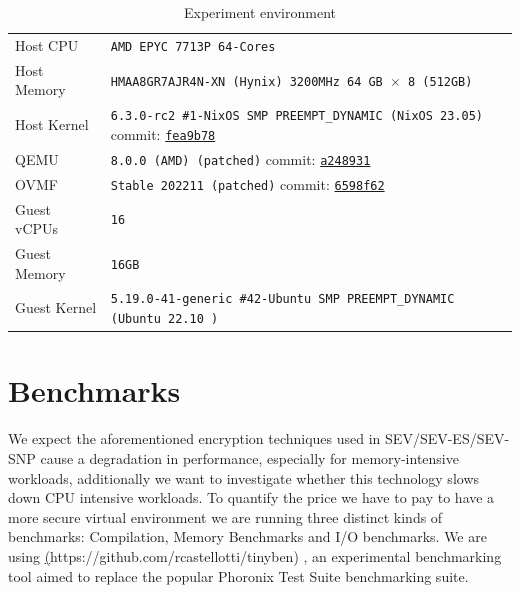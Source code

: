 \documentclass[twocolumn]{article}
\begin{document}
    \begin{table}
        \small
        \centering
        \label{tab:experiment-environment}
        \begin{tabular}{l|l}
            \hline
            Host CPU      & \texttt{AMD EPYC 7713P 64-Cores}                                            \\
            Host Memory   & \texttt{HMAA8GR7AJR4N-XN (Hynix) 3200MHz 64 GB $\times$ 8 (512GB)}          \\
            Host Kernel   & \texttt{6.3.0-rc2 \#1-NixOS SMP PREEMPT\_DYNAMIC (NixOS 23.05)} commit: \href{https://github.com/AMDESE/linux/tree/fea9b785bfa90e015c7d81526e36060da1bf01d1}{\texttt{fea9b78}}            \\
            QEMU          & \texttt{8.0.0 (AMD) (patched)} commit: \href{https://github.com/AMDESE/qemu/tree/a248931547843b9edb0f3b0c7d6d0c76ffdf7659}{\texttt{a248931}}                                             \\
            OVMF          & \texttt{Stable 202211 (patched)} commit: \href{https://github.com/AMDESE/ovmf/commit/6598f62bda4eb884c65d6c0aed7ede64258a41d8}{\texttt{6598f62}}                                     \\
            Guest vCPUs   & \texttt{16}                                                                 \\
            Guest Memory  & \texttt{16GB}                                                               \\
            Guest Kernel  & \texttt{5.19.0-41-generic \#42-Ubuntu SMP PREEMPT\_DYNAMIC (Ubuntu 22.10 )} \\ 
            \hline
        \end{tabular}
        \caption{Experiment environment}
    \end{table}

\section{Benchmarks}
    We expect the aforementioned encryption techniques used in SEV/SEV-ES/SEV-SNP cause a degradation in performance, especially for memory-intensive workloads, additionally we want to investigate whether this technology slows down CPU intensive workloads. To quantify the price we have to pay to have a more secure virtual environment we are running three distinct kinds of benchmarks: Compilation, Memory Benchmarks and I/O benchmarks. We are using \href{rcastellotti/tinyben}(https://github.com/rcastellotti/tinyben) \cite{tinyben}, an experimental benchmarking tool aimed to replace the popular Phoronix Test Suite \cite{pts} benchmarking suite.
\end{document}
